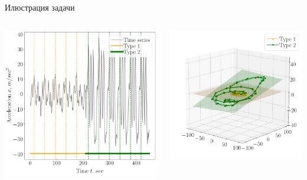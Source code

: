 \documentclass[10pt,pdf,hyperref={unicode}]{beamer}
\begin{document}
\begin{frame}[shrink=5]{Илюстрация задачи}


\begin{columns}
    \begin{column}{0.6\textwidth}
        \includegraphics[width=1\textwidth]{results/example}
    \end{column}
    \begin{column}{0.6\textwidth}
        \includegraphics[width=1\textwidth]{results/example_phase}
    \end{column}
\end{columns}


\end{frame}
\end{document}
